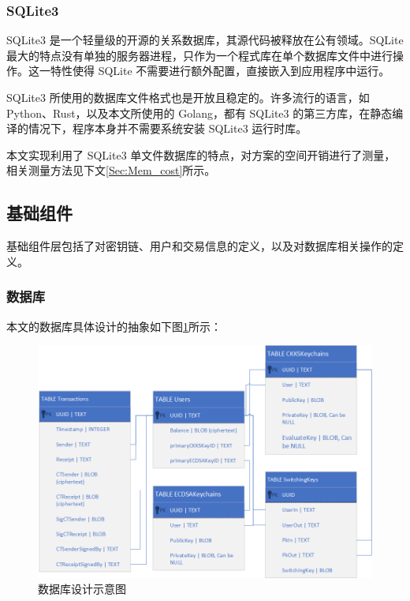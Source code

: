 \subsubsection*{SQLite3}

SQLite3 是一个轻量级的开源的关系数据库，其源代码被释放在公有领域\cite{sqlite3}。SQLite 最大的特点没有单独的服务器进程，只作为一个程式库在单个数据库文件中进行操作。这一特性使得 SQLite 不需要进行额外配置，直接嵌入到应用程序中运行。

SQLite3 所使用的数据库文件格式也是开放且稳定的。许多流行的语言，如 Python、Rust，以及本文所使用的 Golang，都有 SQLite3 的第三方库，在静态编译的情况下，程序本身并不需要系统安装 SQLite3 运行时库。

本文实现利用了 SQLite3 单文件数据库的特点，对方案的空间开销进行了测量，相关测量方法见下文\ref{Sec:Mem_cost}所示。

\subsection{基础组件}

基础组件层包括了对密钥链、用户和交易信息的定义，以及对数据库相关操作的定义。

\subsubsection*{数据库}

本文的数据库具体设计的抽象如下图\ref*{Fig:Database}所示：

\begin{figure}[ht]
    \centering
    \includegraphics[width=\linewidth]{Figures/chimata-database-design.png}
    \caption{数据库设计示意图}\label{Fig:Database}
\end{figure}

